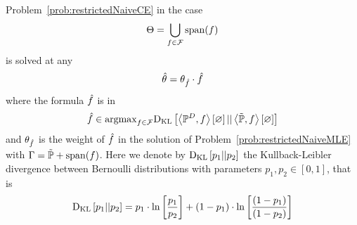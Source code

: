 \begin{theorem}
	Problem~\ref{prob:restrictedNaiveCE} in the case 
	\begin{align*}
		\Theta = \bigcup_{f\in\mathcal{F}} \mathrm{span}(f) 
	\end{align*}
	is solved at any
	\begin{align*}
		\hat{\theta} = \theta_{\hat{f}} \cdot \hat{f}
	\end{align*}
	where the formula $\hat{f}$ is in
	\begin{align*}
		\hat{f} \in \mathrm{argmax}_{f\in\mathcal{F}} \mathrm{D}_{\mathrm{KL}}\left[ \left\langle \mathbb{P}^{D},f\right\rangle \left[ \varnothing \right] || \left\langle \tilde{\mathbb{P}},f\right\rangle \left[ \varnothing \right] \right]
	\end{align*}
	and $\theta_{\hat{f}}$ is the weight of $\hat{f}$ in the solution of Problem~\ref{prob:restrictedNaiveMLE} with $\Gamma = \tilde{\mathbb{P}} + \mathrm{span}(f)$.
	Here we denote by $\mathrm{D}_{\mathrm{KL}}\left[ p_1 || p_2 \right]$ the Kullback-Leibler divergence between Bernoulli distributions with parameters $p_1,p_2\in[0,1]$, that is
		\[ \mathrm{D}_{\mathrm{KL}}\left[ p_1 || p_2 \right] = p_1 \cdot \ln \left[ \frac{p_1}{p_2} \right] + (1-p_1) \cdot \ln \left[ \frac{(1-p_1)}{(1-p_2)} \right]  \]
\end{theorem}	
